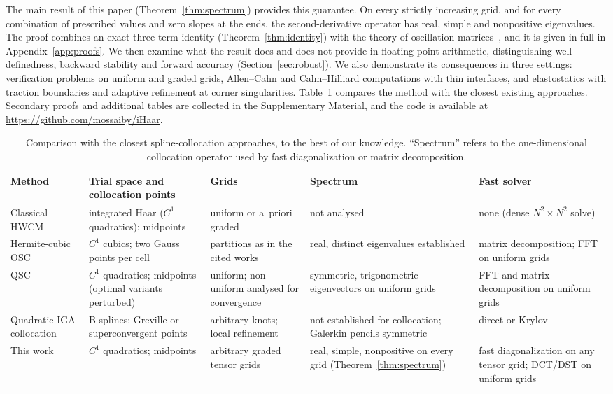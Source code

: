 \documentclass[smallextended,envcountsame]{svjour3}
\newcommand{\repo}{\url{https://github.com/mossaiby/iHaar}}
\begin{document}
The main result of this paper (Theorem~\ref{thm:spectrum}) provides this guarantee. On every strictly
increasing grid, and for every combination of prescribed values and zero slopes at the ends, the
second-derivative operator has real, simple and nonpositive eigenvalues. The proof combines an exact
three-term identity (Theorem~\ref{thm:identity}) with the theory of oscillation
matrices~\cite{gantmacher2002oscillation,fallat2011totally}, and it is given in full in
Appendix~\ref{app:proofs}. We then examine what the result does and does not provide in floating-point
arithmetic, distinguishing well-definedness, backward stability and forward accuracy
(Section~\ref{sec:robust}). We also demonstrate its consequences in three settings: verification problems on
uniform and graded grids, Allen--Cahn and Cahn--Hilliard computations with thin interfaces, and
elastostatics with traction boundaries and adaptive refinement at corner singularities.
Table~\ref{tab:closest} compares the method with the closest existing approaches. Secondary proofs and
additional tables are collected in the Supplementary Material, and the code is available at \repo.

\begin{table}[t]\centering\footnotesize
\caption{Comparison with the closest spline-collocation approaches, to the best of our knowledge.
``Spectrum'' refers to the one-dimensional collocation operator used by fast diagonalization or matrix
decomposition.}\label{tab:closest}
\begin{tabular}{p{}p{}p{}p{}p{}}
\toprule
Method & Trial space and collocation points & Grids & Spectrum & Fast solver\\
\midrule
Classical HWCM~\cite{lepik2011solving,oruc2019nonuniform} & integrated Haar ($C^1$ quadratics); midpoints & uniform or a~priori graded & not analysed & none (dense $N^2\times N^2$ solve)\\
Hermite-cubic OSC~\cite{dyksen1987tensor,sun1999spectral,bialecki1995matrix} & $C^1$ cubics; two Gauss points per cell & partitions as in the cited works & real, distinct eigenvalues established & matrix decomposition; FFT on uniform grids\\
QSC~\cite{houstis1988quadratic,christara2002fast,christara2006optimal} & $C^1$ quadratics; midpoints (optimal variants perturbed) & uniform; non-uniform analysed for convergence & symmetric, trigonometric eigenvectors on uniform grids & FFT and matrix decomposition on uniform grids\\
Quadratic IGA collocation~\cite{auricchio2010isogeometric,schillinger2013isogeometric,delorenzis2015isogeometric} & B-splines; Greville or superconvergent points & arbitrary knots; local refinement & not established for collocation; Galerkin pencils symmetric~\cite{sangalli2016isogeometric} & direct or Krylov\\
This work & $C^1$ quadratics; midpoints & arbitrary graded tensor grids & real, simple, nonpositive on every grid (Theorem~\ref{thm:spectrum}) & fast diagonalization on any tensor grid; DCT/DST on uniform grids\\
\bottomrule
\end{tabular}
\end{table}
\end{document}
